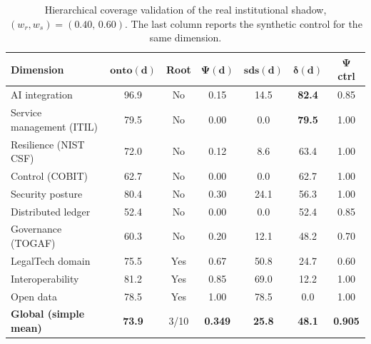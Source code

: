 \documentclass[engproc,proceedingpaper,submit,moreauthors]{Definitions/mdpi}
\begin{document}
\begin{table}[H]
\small
\caption{Hierarchical coverage validation of the real institutional shadow, $(w_r,w_s)=(0.40,\,0.60)$. The last column reports the synthetic control for the same dimension.\label{tab:validation}}
\begin{tabularx}{\textwidth}{Xcccccc}
\toprule
\textbf{Dimension} & $\mathbf{onto(d)}$ & \textbf{Root} & $\mathbf{\Psi(d)}$ & $\mathbf{sds(d)}$ & $\boldsymbol{\delta}\mathbf{(d)}$ & $\mathbf{\Psi}$ \textbf{ctrl}\\
\midrule
AI integration            & 96.9 & No  & 0.15 & 14.5 & \textbf{82.4} & 0.85\\
Service management (ITIL) & 79.5 & No  & 0.00 & 0.0  & \textbf{79.5} & 1.00\\
Resilience (NIST CSF)     & 72.0 & No  & 0.12 & 8.6  & 63.4 & 1.00\\
Control (COBIT)           & 62.7 & No  & 0.00 & 0.0  & 62.7 & 1.00\\
Security posture          & 80.4 & No  & 0.30 & 24.1 & 56.3 & 1.00\\
Distributed ledger        & 52.4 & No  & 0.00 & 0.0  & 52.4 & 0.85\\
Governance (TOGAF)        & 60.3 & No  & 0.20 & 12.1 & 48.2 & 0.70\\
LegalTech domain          & 75.5 & Yes & 0.67 & 50.8 & 24.7 & 0.60\\
Interoperability          & 81.2 & Yes & 0.85 & 69.0 & 12.2 & 1.00\\
Open data                 & 78.5 & Yes & 1.00 & 78.5 & 0.0  & 1.00\\
\midrule
\textbf{Global (simple mean)} & \textbf{73.9} & 3/10 & \textbf{0.349} & \textbf{25.8} & \textbf{48.1} & \textbf{0.905}\\
\bottomrule
\end{tabularx}
\end{table}
\end{document}
